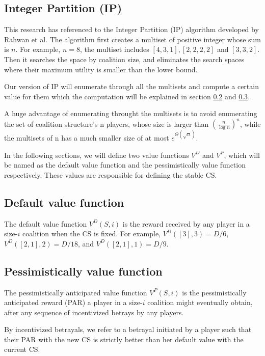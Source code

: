 \documentclass[sigconf,anonymous]{aamas}
\begin{document}
\subsection{Integer Partition (IP)}

This research has referenced to the Integer Partition (IP) algorithm developed by Rahwan et al. The algorithm first creates a multiset of positive integer whose sum is $n$. For example, $n=8$, the multiset includes $[4, 3, 1], [2, 2, 2, 2]$ and $[3, 3, 2]$. Then it searches the space by coalition size, and eliminates the search spaces where their maximum utility is smaller than the lower bound. 

Our version of IP will enumerate through all the multisets and compute a certain value for them which the computation will be explained in section \ref{sec:dv-func} and \ref{sec:pv-func}. 

A huge advantage of enumerating throught the multisets is to avoid enumerating the set of coalition structure's n players, whose size is larger than $(\frac{n}{\log n })^n$, while the multisets of n has a much smaller size of at most $e^{\Theta(\sqrt{n})}$. 

In the following sections, we will define two value functions $V^D$ and $V^P$, which will be named as the default value function and the pessimistically value function respectively. These values are responsible for defining the stable CS. 

\subsection{Default value function}
\label{sec:dv-func}

The default value function $V^D(S, i)$ is the reward received by any player in a size-$i$ coalition when the CS is fixed. 
For example, $V^D([3], 3) = D/6$, $V^D([2, 1], 2) = D/18$, and $V^D([2, 1], 1) = D/9$. 

\subsection{Pessimistically value function}
\label{sec:pv-func}

The pessimistically anticipated value function $V^P(S, i)$ is the pessimistically anticipated reward (PAR) a player in a size-$i$ coalition might eventually obtain, after any sequence of incentivized betrays by any players.

By incentivized betrayals, we refer to a betrayal initiated by a player such that their PAR with the new CS is strictly better than her default value with the current CS. 
\end{document}
